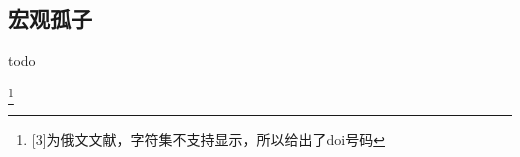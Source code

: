 \documentclass{article}
\begin{document}
\begin{multicols}{2}
\subsection{宏观孤子}
todo
\end{multicols}

%


\footnote{[3]为俄文文献，字符集不支持显示，所以给出了doi号码} 
\end{document}
